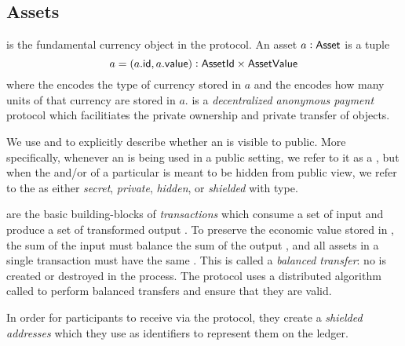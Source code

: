 \subsection{Assets}

\Asset{} is the fundamental currency object in the \MantaPay{} protocol. An asset $a : {\textsf{Asset}}$ is a tuple
\[a = (a.{\textsf{id}}, a.{\textsf{value}}) : {\textsf{AssetId}} \times {\textsf{AssetValue}}\]
where the \AssetId{} encodes the type of currency stored in $a$ and the \AssetValue{} encodes how many units of that currency are stored in $a$.  \MantaPay{} is a \emph{decentralized anonymous payment} protocol which facilitiates the private ownership and private transfer of \Asset{} objects. 


We use \PublicAsset{} and \SecretAsset{} to explicitly describe whether an \Asset{} is visible to public.
More specifically, whenever an \Asset{} is being used in a public setting, we refer to it as a \PublicAsset{}, 
but when the \AssetId{} and/or \AssetValue{} of a particular \Asset{} is meant to be hidden from public view, we refer to the \Asset{} as either \emph{secret}, \emph{private}, \emph{hidden}, or \emph{shielded} with \SecretAsset{} type.

 are the basic building-blocks of \emph{transactions} which consume a set of input  and produce a set of transformed output . To preserve the economic value stored in , the sum of the input  must balance the sum of the output , and all assets in a single transaction must have the same \AssetId{}\footnotemark{}. This is called a \emph{balanced transfer}: no \AssetValue{} is created or destroyed in the process. The \MantaPay{} protocol uses a distributed algorithm called \Transfer{} to perform balanced transfers and ensure that they are valid.


In order for \MantaPay{} participants to receive  via the \Transfer{} protocol, they create a \emph{shielded addresses} which they use as identifiers to represent them on the ledger.

